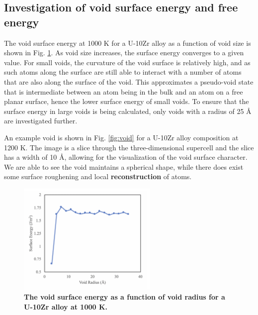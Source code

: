 \documentclass[review]{elsarticle}
\providecommand{\DIFaddtex}[1]{{\bf #1}} %
\providecommand{\DIFdeltex}[1]{} %
\providecommand{\DIFaddbegin}{\protect\color{blue}} %
\providecommand{\DIFaddend}{\protect\color{black}} %
\providecommand{\DIFdelbegin}{\protect\color{red}} %
\providecommand{\DIFdelend}{\protect\color{black}} %
\providecommand{\DIFaddFL}[1]{\DIFadd{#1}} %
\providecommand{\DIFdelFL}[1]{\DIFdel{#1}} %
\providecommand{\DIFadd}[1]{\texorpdfstring{\DIFaddtex{#1}}{#1}} %
\providecommand{\DIFdel}[1]{\texorpdfstring{\DIFdeltex{#1}}{}} %
\newcommand{\DIFscaledelfig}{0.5}
\newlength{\DIFdelgraphicswidth} %
\newlength{\DIFdelgraphicsheight} %
\newcommand{\DIFaddincludegraphics}[2][]{{\color{blue}\fbox{\DIFOincludegraphics[#1]{#2}}}} %
\newcommand{\DIFdelincludegraphics}[2][]{%
\sbox{\DIFdelgraphicsbox}{\DIFOincludegraphics[#1]{#2}}%
\settoboxwidth{\DIFdelgraphicswidth}{\DIFdelgraphicsbox} %
\settoboxtotalheight{\DIFdelgraphicsheight}{\DIFdelgraphicsbox} %
\scalebox{\DIFscaledelfig}{%
\parbox[b]{\DIFdelgraphicswidth}{\usebox{\DIFdelgraphicsbox}\\[-\baselineskip] \rule{\DIFdelgraphicswidth}{0em}}\llap{\resizebox{\DIFdelgraphicswidth}{\DIFdelgraphicsheight}{%
\setlength{\unitlength}{\DIFdelgraphicswidth}%
\begin{picture}(1,1)%
\thicklines\linethickness{2pt} %
{\color[rgb]{1,0,0}\put(0,0){\framebox(1,1){}}}%
{\color[rgb]{1,0,0}\put(0,0){\line( 1,1){1}}}%
{\color[rgb]{1,0,0}\put(0,1){\line(1,-1){1}}}%
\end{picture}%
}\hspace*{3pt}}} %
} %
\DeclareRobustCommand{\DIFaddbegin}{\DIFOaddbegin \let\includegraphics\DIFaddincludegraphics} %
\DeclareRobustCommand{\DIFaddend}{\DIFOaddend \let\includegraphics\DIFOincludegraphics} %
\DeclareRobustCommand{\DIFdelbegin}{\DIFOdelbegin \let\includegraphics\DIFdelincludegraphics} %
\DeclareRobustCommand{\DIFdelend}{\DIFOaddend \let\includegraphics\DIFOincludegraphics} %
\begin{document}
\subsection{Investigation of void surface energy and free energy}\label{sec:res2}

The void surface energy at 1000 K for a U-10Zr alloy as a function of void size is shown in Fig. \ref{fig:size}. As void size increases, the surface energy \DIFdelbegin \DIFdel{increases and }\DIFdelend converges to a given value. For small voids, the curvature of the void surface is relatively high, and as such atoms along the surface are still able to interact with a number of atoms that are also along the surface of the void. This approximates a pseudo-void state that is intermediate between an atom being in the bulk and an atom on a free planar surface, hence the lower surface energy of small voids. To ensure that the surface energy in large voids is being calculated, only voids with a radius of 25 {\AA} are investigated further. \DIFdelbegin %

{%
\DIFdelFL{The void surface energy as a function of void radius for a U-10Zr alloy at 1000 K. }}

\DIFdelend An example void is shown in Fig. \ref{fig:void} for a U-10Zr alloy composition at 1200 K. The image is a slice through the three-dimensional supercell and the slice has a width of 10 \AA, allowing for the visualization of the void surface character. We are able to see the void maintains a spherical shape, while there does exist some surface roughening and local \DIFdelbegin \DIFdel{rconstruction }\DIFdelend \DIFaddbegin \DIFadd{reconstruction }\DIFaddend of atoms. 
\DIFdelbegin \DIFdel{The associated }\DIFdelend \DIFaddbegin 

\begin{figure}[!htp]
\begin{center}
\includegraphics[width=0.6\textwidth]{6_size}
\end{center}
\caption{\DIFaddFL{The void surface energy as a function of void radius for a U-10Zr alloy at 1000 K. }}
\label{fig:size}
\end{figure}
\end{document}
